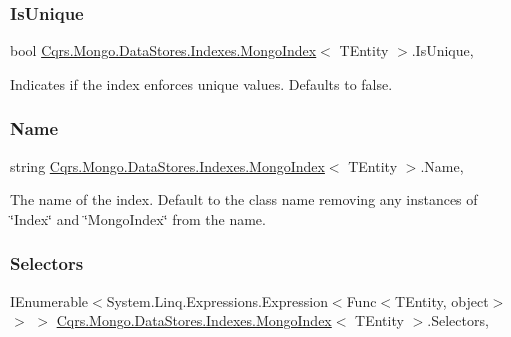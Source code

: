 \subsubsection{\texorpdfstring{Is\+Unique}{IsUnique}}
{\footnotesize\ttfamily bool \hyperlink{classCqrs_1_1Mongo_1_1DataStores_1_1Indexes_1_1MongoIndex}{Cqrs.\+Mongo.\+Data\+Stores.\+Indexes.\+Mongo\+Index}$<$ T\+Entity $>$.Is\+Unique\hspace{0.3cm}{\ttfamily [get]}, {}}



Indicates if the index enforces unique values. Defaults to false. 

\mbox{\label{classCqrs_1_1Mongo_1_1DataStores_1_1Indexes_1_1MongoIndex_a635b552b98a7638ca3a474e54652fde6}} 
\subsubsection{\texorpdfstring{Name}{Name}}
{\footnotesize\ttfamily string \hyperlink{classCqrs_1_1Mongo_1_1DataStores_1_1Indexes_1_1MongoIndex}{Cqrs.\+Mongo.\+Data\+Stores.\+Indexes.\+Mongo\+Index}$<$ T\+Entity $>$.Name\hspace{0.3cm}{\ttfamily [get]}, {}}



The name of the index. Default to the class name removing any instances of \char`\"{}\+Index\char`\"{} and \char`\"{}\+Mongo\+Index\char`\"{} from the name. 

\mbox{\label{classCqrs_1_1Mongo_1_1DataStores_1_1Indexes_1_1MongoIndex_a43e73501f54becfaee4430a89841055a}} 
\subsubsection{\texorpdfstring{Selectors}{Selectors}}
{\footnotesize\ttfamily I\+Enumerable$<$System.\+Linq.\+Expressions.\+Expression$<$Func$<$T\+Entity, object$>$ $>$ $>$ \hyperlink{classCqrs_1_1Mongo_1_1DataStores_1_1Indexes_1_1MongoIndex}{Cqrs.\+Mongo.\+Data\+Stores.\+Indexes.\+Mongo\+Index}$<$ T\+Entity $>$.Selectors\hspace{0.3cm}{\ttfamily [get]}, {}}

